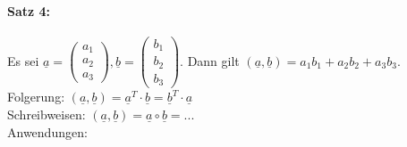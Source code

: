 \paragraph{Satz 4:} \parskp
Es sei $\underline{a}=\begin{pmatrix}
a_1\\
a_2\\
a_3
\end{pmatrix}, \underline{b}=\begin{pmatrix}
b_1\\
b_2\\
b_3
\end{pmatrix}$. Dann gilt $\boxed{(\underline{a}, \underline{b})=a_1b_1+a_2b_2+a_3b_3}$.\\
Folgerung: $\boxed{(\underline{a}, \underline{b})=\underline{a}^T \cdot \underline{b}=\underline{b}^T \cdot \underline{a}}$\\
Schreibweisen: $(\underline{a}, \underline{b})= \underline{a} \circ \underline{b}= ...$\medskip\\
Anwendungen:
